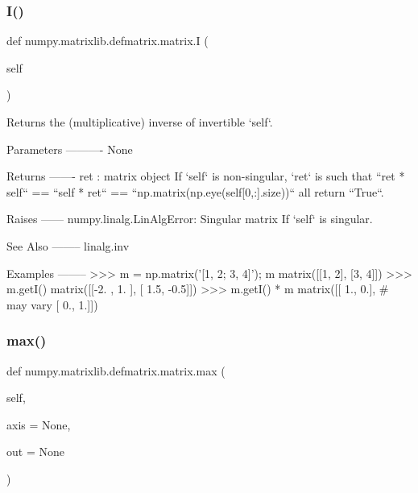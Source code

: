 \subsubsection{\texorpdfstring{I()}{I()}}
{\footnotesize\ttfamily def numpy.\+matrixlib.\+defmatrix.\+matrix.\+I (\begin{DoxyParamCaption}\item[{}]{self }\end{DoxyParamCaption})}

\begin{DoxyVerb}Returns the (multiplicative) inverse of invertible `self`.

Parameters
----------
None

Returns
-------
ret : matrix object
    If `self` is non-singular, `ret` is such that ``ret * self`` ==
    ``self * ret`` == ``np.matrix(np.eye(self[0,:].size))`` all return
    ``True``.

Raises
------
numpy.linalg.LinAlgError: Singular matrix
    If `self` is singular.

See Also
--------
linalg.inv

Examples
--------
>>> m = np.matrix('[1, 2; 3, 4]'); m
matrix([[1, 2],
[3, 4]])
>>> m.getI()
matrix([[-2. ,  1. ],
[ 1.5, -0.5]])
>>> m.getI() * m
matrix([[ 1.,  0.], # may vary
[ 0.,  1.]])\end{DoxyVerb}
 \mbox{\label{classnumpy_1_1matrixlib_1_1defmatrix_1_1matrix_aa384de862290cc3463f2f5add565961b}} 
\subsubsection{\texorpdfstring{max()}{max()}}
{\footnotesize\ttfamily def numpy.\+matrixlib.\+defmatrix.\+matrix.\+max (\begin{DoxyParamCaption}\item[{}]{self,  }\item[{}]{axis = {\ttfamily None},  }\item[{}]{out = {\ttfamily None} }\end{DoxyParamCaption})}

